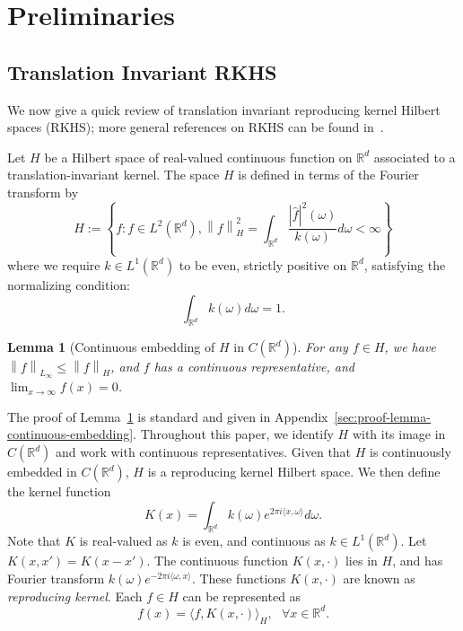 \documentclass[sn-mathphys-num]{sn-jnl}%
\numberwithin{equation}{section}
\newcommand{\R}{\mathbb{R}}
\newcommand{\kernel}{K}
\newcommand{\norm}[1]{\left\|{#1}\right\|} %
\newtheorem{lemma}{Lemma}
\theoremstyle{thmstyleone}%
\theoremstyle{thmstyletwo}%
\theoremstyle{thmstylethree}%
\begin{document}
\section{Preliminaries} 
\label{sec:preliminaries} 
\subsection{Translation Invariant RKHS} 
\label{sec:translation-invariant-RKHS}
We now give a quick review of translation invariant reproducing kernel
Hilbert spaces (RKHS); more general references on RKHS can be found in~\cite{Aronszajn50, CuckerSm02}. 

Let $H$ be a Hilbert space of real-valued continuous function on $\R^d$ associated to a 
translation-invariant kernel. The space $H$ is defined in terms of the Fourier transform by 
\begin{equation*}
	H := \left\{f: f \in  L^2(\R^d), 
		\norm{f}_H^2 = \int_{\R^d} \frac{|\hat{f}|^2(\omega)}{k(\omega)} d\omega < \infty\right\}
\end{equation*}
where we require $k \in L^1(\R^d)$ to be even, strictly positive on $\R^d$, satisfying the normalizing condition: 
\begin{equation*}
	\int_{\R^d} k(\omega) d\omega = 1.
\end{equation*}


\begin{lemma}[Continuous embedding of $H$ in $C(\R^d)$]
\label{lemma:continuous-embedding}
For any $f \in H$, we have $\norm{f}_{L_\infty} \le \norm{f}_H$, and $f$ has a continuous representative, and $\lim_{x \to \infty} f(x) = 0$.
\end{lemma} 
The proof of Lemma~\ref{lemma:continuous-embedding} is standard and given in Appendix~\ref{sec:proof-lemma-continuous-embedding}. Throughout this paper, we identify $H$ with its image in $C(\R^d)$ and work with continuous representatives. Given that $H$ is continuously embedded in $C(\R^d)$, $H$ is a reproducing kernel Hilbert space. We then define the kernel function
\begin{equation*}
	\kernel(x) = \int_{\R^d} k(\omega) e^{2\pi i \langle x, \omega\rangle} d\omega.
\end{equation*} 
Note that $\kernel$ is real-valued as $k$ is even, and continuous as $k \in L^1(\R^d)$. 
Let $\kernel(x, x') = \kernel(x-x')$.
The continuous function $\kernel(x, \cdot)$ lies in $H$, and has Fourier transform 
$k(\omega) e^{-2\pi i\langle \omega, x\rangle}$. These functions $\kernel(x, \cdot)$ 
are known as \emph{reproducing kernel}. Each $f \in H$ can be represented as 
\begin{equation*}
	f(x) = \langle f, \kernel(x, \cdot)\rangle_H,~~~\forall x\in \R^d.
\end{equation*}
\end{document}
